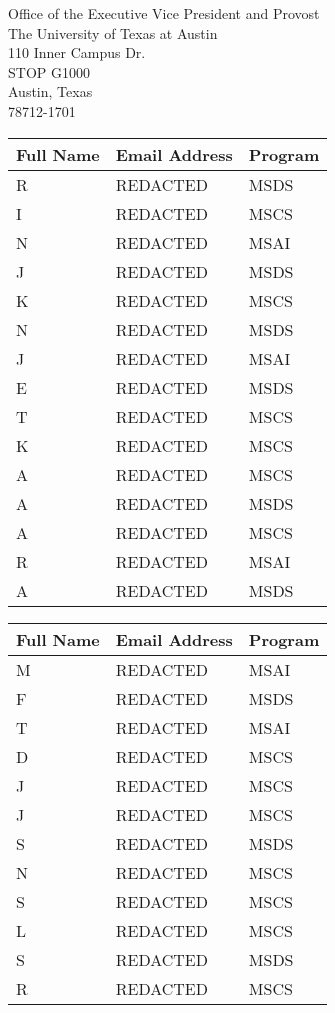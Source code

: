 \documentclass[11pt]{letter}
\begin{document}
\begin{letter}{Office of the Executive Vice President and Provost \\ The University of Texas at Austin \\ 110 Inner Campus Dr. \\ STOP G1000 \\ Austin, Texas \\ 78712-1701}
    \centering
    \begin{tabular}{|p{5cm}|p{6.7cm}|p{2.25cm}|}
        \hline
        \textbf{Full Name} & \textbf{Email Address} & \textbf{Program} \\ \hline
        R & REDACTED & MSDS \\ \hline
        I & REDACTED & MSCS \\ \hline
        N & REDACTED & MSAI \\ \hline
        J & REDACTED & MSDS \\ \hline
        K & REDACTED & MSCS \\ \hline
        N & REDACTED & MSDS \\ \hline
        J & REDACTED & MSAI \\ \hline
        E & REDACTED & MSDS \\ \hline
        T & REDACTED & MSCS \\ \hline
        K & REDACTED & MSCS \\ \hline
        A & REDACTED & MSCS \\ \hline
        A & REDACTED & MSDS \\ \hline
        A & REDACTED & MSCS \\ \hline
        R & REDACTED & MSAI \\ \hline
        A & REDACTED & MSDS \\ \hline
    \end{tabular}
    \centering
    \begin{tabular}{|p{5cm}|p{6.7cm}|p{2.25cm}|}
        \hline
        \textbf{Full Name} & \textbf{Email Address} & \textbf{Program} \\ \hline
        M & REDACTED & MSAI \\ \hline
        F & REDACTED & MSDS \\ \hline
        T & REDACTED & MSAI \\ \hline
        D & REDACTED & MSCS \\ \hline
        J & REDACTED & MSCS \\ \hline
        J & REDACTED & MSCS \\ \hline
        S & REDACTED & MSDS \\ \hline
        N & REDACTED & MSCS \\ \hline
        S & REDACTED & MSCS \\ \hline
        L & REDACTED & MSCS \\ \hline
        S & REDACTED & MSDS \\ \hline
        R & REDACTED & MSCS \\ \hline

\end{tabular}
\end{letter}
\end{document}
